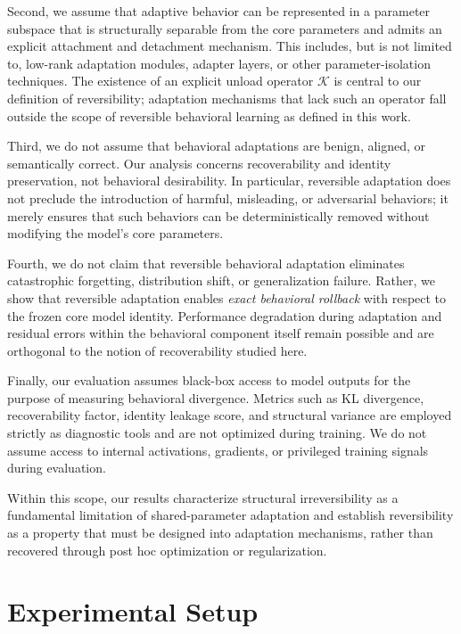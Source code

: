 \documentclass{article}
\begin{document}
	Second, we assume that adaptive behavior can be represented in a parameter subspace that is structurally separable from the core parameters and admits an explicit attachment and detachment mechanism. This includes, but is not limited to, low-rank adaptation modules, adapter layers, or other parameter-isolation techniques. The existence of an explicit unload operator $\mathcal{K}$ is central to our definition of reversibility; adaptation mechanisms that lack such an operator fall outside the scope of reversible behavioral learning as defined in this work.
	
	Third, we do not assume that behavioral adaptations are benign, aligned, or semantically correct. Our analysis concerns recoverability and identity preservation, not behavioral desirability. In particular, reversible adaptation does not preclude the introduction of harmful, misleading, or adversarial behaviors; it merely ensures that such behaviors can be deterministically removed without modifying the model’s core parameters.
	
	Fourth, we do not claim that reversible behavioral adaptation eliminates catastrophic forgetting, distribution shift, or generalization failure. Rather, we show that reversible adaptation enables \emph{exact behavioral rollback} with respect to the frozen core model identity. Performance degradation during adaptation and residual errors within the behavioral component itself remain possible and are orthogonal to the notion of recoverability studied here.
	
	Finally, our evaluation assumes black-box access to model outputs for the purpose of measuring behavioral divergence. Metrics such as KL divergence, recoverability factor, identity leakage score, and structural variance are employed strictly as diagnostic tools and are not optimized during training. We do not assume access to internal activations, gradients, or privileged training signals during evaluation.
	
	Within this scope, our results characterize structural irreversibility as a fundamental limitation of shared-parameter adaptation and establish reversibility as a property that must be designed into adaptation mechanisms, rather than recovered through post hoc optimization or regularization.
	
	
	\section{Experimental Setup}
	\label{sec:exp_setup}
	
\end{document}
